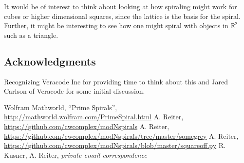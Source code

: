 \documentclass[11pt]{amsart}
\theoremstyle{mydef}
\begin{document}
It would be of interest to think about looking at how spiraling might work for cubes or higher dimensional squares, since the lattice is the basis for the spiral. Further, it might be interesting to see how one might spiral with objects in $\mathbb{R}^2$ such as a triangle.

\subsection{Acknowledgments}
Recognizing Veracode Inc for providing time to think about this and Jared Carlson of Veracode for some initial discussion.

\begin{thebibliography}{1}
 Wolfram Mathworld, ``Prime Spirals'', \url{http://mathworld.wolfram.com/PrimeSpiral.html}
 A. Reiter, \url{https://github.com/cwcomplex/modNspirals}
 A. Reiter, \url{https://github.com/cwcomplex/modNspirals/tree/master/somegrey}
 A. Reiter, \url{https://github.com/cwcomplex/modNspirals/blob/master/squareoff.py}
 R. Kusner, A. Reiter, \textit{private email correspondence}

\end{thebibliography}
\end{document}

